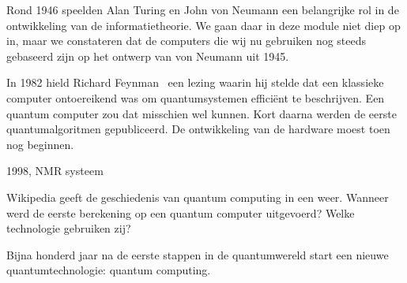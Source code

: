 

Rond 1946 speelden Alan Turing en John von Neumann een belangrijke rol in de ontwikkeling van de informatietheorie. We gaan daar in deze module niet diep op in, maar we constateren dat de computers die wij nu gebruiken nog steeds gebaseerd zijn op het  {ontwerp} van von Neumann uit 1945.  

In 1982 hield Richard Feynman~\cite{feynman1982simulating} een lezing waarin hij stelde dat een klassieke computer ontoereikend was om quantumsystemen effici\"ent te beschrijven. Een quantum computer zou dat misschien wel kunnen. Kort daarna werden de eerste quantumalgoritmen gepubliceerd. De ontwikkeling van de hardware moest toen nog beginnen.
\medskip
\begin{antwoord}
1998, NMR systeem
\end{antwoord}
\begin{opdracht}\label{opd:tijdlijn}
Wikipedia geeft de geschiedenis van quantum computing in een  weer. 
Wanneer werd de eerste berekening op een quantum computer uitgevoerd? Welke technologie gebruiken zij?
\end{opdracht}
Bijna honderd jaar na de eerste stappen in de quantumwereld start een nieuwe quantumtechnologie: quantum computing. 
\fi%

\iffalse
\includemovie[
 poster,
 text={\small(click to load singlephotondoubleslit.mp4)}
]{12cm}{4cm}{./img/singlephotondoubleslit.mp4}
\fi

